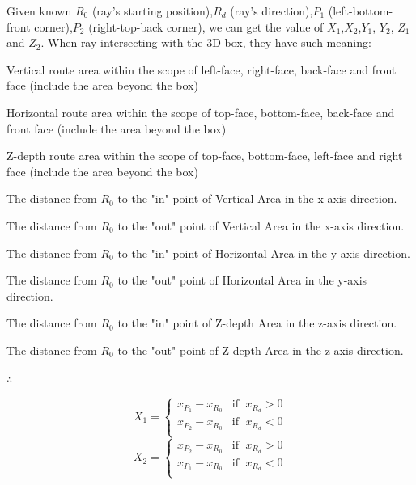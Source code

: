 Given known $R_0$ (ray's starting position),\enspace$R_d$ (ray's direction),\enspace$P_1$ (left-bottom-front corner),\enspace$P_2$ (right-top-back corner), we can get the value of $X_1$,\enspace$X_2$,\enspace$Y_1$, $Y_2$, $Z_1$ and $Z_2$. When ray intersecting with the 3D box, they have such meaning:

\begin{description}
	\setlength{\parskip}{0pt}
	\item[$\bullet$ Vertical Area] Vertical route area within the scope of left-face, right-face, back-face and front face (include the area beyond the box)
	\item[$\bullet$ Horizontal Area] Horizontal route area within the scope of top-face, bottom-face, back-face and front face (include the area beyond the box)
	\item[$\bullet$ Z-depth Area] Z-depth route area within the scope of top-face, bottom-face, left-face and right face (include the area beyond the box)
	\item[$\bullet$ $\mathbf{X}_1$] The distance from $R_0$ to the "in" point of Vertical Area in the x-axis direction.   
	\item[$\bullet$ $\mathbf{X}_2$] The distance from $R_0$ to the "out" point of Vertical Area in the x-axis direction. 
	\item[$\bullet$ $\mathbf{Y}_1$] The distance from $R_0$ to the "in" point of Horizontal Area in the y-axis direction.
	\item[$\bullet$ $\mathbf{Y}_2$] The distance from $R_0$ to the "out" point of Horizontal Area in the y-axis direction. 
	\item[$\bullet$ $\mathbf{Z}_1$] The distance from $R_0$ to the "in" point of Z-depth Area in the z-axis direction.
	\item[$\bullet$ $\mathbf{Z}_2$] The distance from $R_0$ to the "out" point of Z-depth Area in the z-axis direction. 
\end{description}

$\therefore$

\begin{multicols}{2}
\noindent
	\[
	X_1 =
	\begin{cases}
	x_{P_1} - x_{R_0} & \text{if }\;x_{R_d} > 0\\
	x_{P_2} - x_{R_0} & \text{if }\;x_{R_d} < 0\\
	\end{cases}
	\]
\columnbreak
	\[
	X_2 =
	\begin{cases}
	x_{P_2} - x_{R_0} & \text{if }\;x_{R_d} > 0\\
	x_{P_1} - x_{R_0} & \text{if }\;x_{R_d} < 0\\
	\end{cases}
	\]
\end{multicols}


